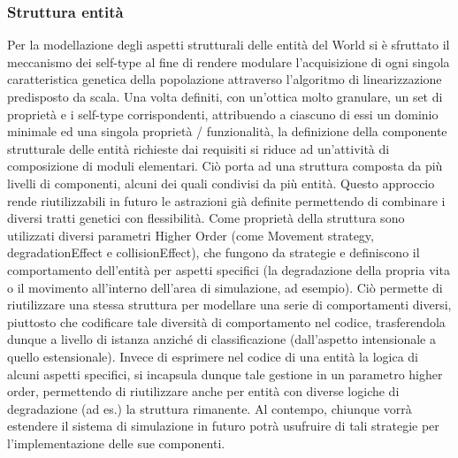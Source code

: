 \subsubsection{Struttura entità}
Per la modellazione degli aspetti strutturali delle entità del World si è sfruttato il meccanismo dei self-type al fine di rendere modulare l’acquisizione di ogni singola caratteristica genetica della popolazione attraverso l’algoritmo di linearizzazione predisposto da scala. Una volta definiti, con un’ottica molto granulare, un set di proprietà e i self-type corrispondenti, attribuendo a ciascuno di essi un dominio minimale ed una singola proprietà / funzionalità, la definizione della componente strutturale delle entità richieste dai requisiti si riduce ad un’attività di composizione di moduli elementari. Ciò porta ad una struttura composta da più livelli di componenti, alcuni dei quali condivisi da più entità. Questo approccio rende riutilizzabili in futuro le astrazioni già definite permettendo di combinare i diversi tratti genetici con flessibilità.
Come proprietà della struttura sono utilizzati diversi parametri Higher Order (come Movement strategy, degradationEffect e collisionEffect), che fungono da strategie e definiscono il comportamento dell’entità per aspetti specifici (la degradazione della propria vita o il movimento all’interno dell’area di simulazione, ad esempio). Ciò permette di riutilizzare una stessa struttura per modellare una serie di comportamenti diversi, piuttosto che codificare tale diversità di comportamento nel codice, trasferendola dunque a livello di istanza anziché di classificazione (dall’aspetto intensionale a quello estensionale). Invece di esprimere nel codice di una entità la logica di alcuni aspetti specifici, si incapsula dunque tale gestione in un parametro higher order, permettendo di riutilizzare anche per entità con diverse logiche di degradazione (ad es.) la struttura rimanente. Al contempo, chiunque vorrà estendere il sistema di simulazione in futuro potrà usufruire di tali strategie per l’implementazione delle sue componenti.


